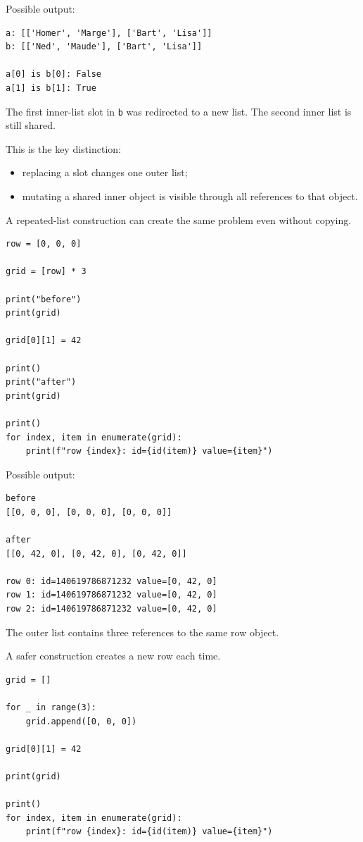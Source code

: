 Possible output:

\begin{verbatim}
a: [['Homer', 'Marge'], ['Bart', 'Lisa']]
b: [['Ned', 'Maude'], ['Bart', 'Lisa']]

a[0] is b[0]: False
a[1] is b[1]: True
\end{verbatim}

The first inner-list slot in \texttt{b} was redirected to a new list. The second inner list is still shared.

This is the key distinction:

\begin{itemize}
    \item replacing a slot changes one outer list;
    \item mutating a shared inner object is visible through all references to that object.
\end{itemize}

A repeated-list construction can create the same problem even without copying.

\begin{verbatim}
row = [0, 0, 0]

grid = [row] * 3

print("before")
print(grid)

grid[0][1] = 42

print()
print("after")
print(grid)

print()
for index, item in enumerate(grid):
    print(f"row {index}: id={id(item)} value={item}")
\end{verbatim}

Possible output:

\begin{verbatim}
before
[[0, 0, 0], [0, 0, 0], [0, 0, 0]]

after
[[0, 42, 0], [0, 42, 0], [0, 42, 0]]

row 0: id=140619786871232 value=[0, 42, 0]
row 1: id=140619786871232 value=[0, 42, 0]
row 2: id=140619786871232 value=[0, 42, 0]
\end{verbatim}

The outer list contains three references to the same row object.

A safer construction creates a new row each time.

\begin{verbatim}
grid = []

for _ in range(3):
    grid.append([0, 0, 0])

grid[0][1] = 42

print(grid)

print()
for index, item in enumerate(grid):
    print(f"row {index}: id={id(item)} value={item}")
\end{verbatim}

